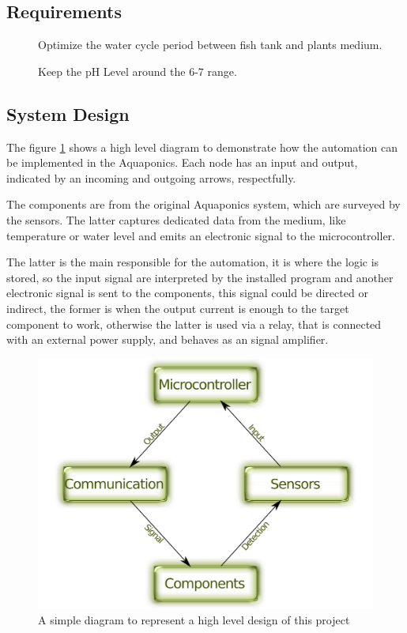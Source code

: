 \subsection{Requirements}
\label{sec:requirements}

\begin{description}

\item []
Optimize the water cycle period between fish tank and plants medium.

\item []
Keep the pH Level around the 6-7 range.

\end{description}

\subsection{System Design}
\label{sec:design}

The figure \ref{fig:highLevelSystemDesign} shows a high level diagram to demonstrate how the automation can be implemented in the Aquaponics.
Each node has an input and output,
indicated by an incoming and outgoing arrows, respectfully.

The components are from the original Aquaponics system,
which are surveyed by the sensors.
The latter captures dedicated data from the medium,
like temperature or water level and emits an electronic signal to the microcontroller.

The latter is the main responsible for the automation,
it is where the logic is stored,
so the input signal are interpreted by the installed program and another electronic signal is sent to the components,
this signal could be directed or indirect,
the former is when the output current is enough to the target component to work,
otherwise the latter is used via a relay,
that is connected with an external power supply,
and behaves as an signal amplifier.

\begin{figure}[h]
    \centering
    \includegraphics[width=.7\linewidth]{diagrams/systemDesign}
    \caption{A simple diagram to represent a high level design of this project}
    \label{fig:highLevelSystemDesign}
\end{figure}

